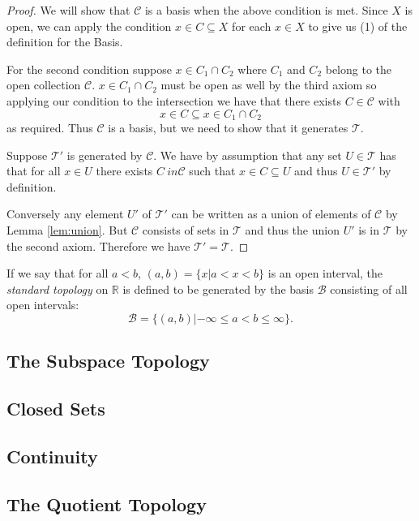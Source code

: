\begin{proof}
  We will show that $\mathscr{C}$ is a basis when the above condition
  is met. Since $X$ is open, we can apply the condition $x \in C
  \subseteq X$ for each $x \in X$ to give us (1) of the definition for
  the Basis.

  For the second condition suppose $x \in C_1 \cap C_2$ where $C_1$
  and $C_2$ belong to the open collection $\mathscr{C}$. $x \in C_1
  \cap C_2$ must be open as well by the third axiom so applying our
  condition to the intersection we have that there exists $C \in
  \mathscr{C}$ with
  \[
    x \in C \subseteq x \in C_1 \cap C_2
  \]
  as required. Thus $\mathscr{C}$ is a basis, but we need to show that
  it generates $\mathscr{T}$.

  Suppose $\mathscr{T}'$ is generated by $\mathscr{C}$. We have by
  assumption that any set $U \in \mathscr{T}$ has that for all $x \in
  U$ there exists $C\ in \mathscr{C}$ such that $x \in C \subseteq U$
  and thus $U \in \mathscr{T}'$ by definition.

  Conversely any element $U'$ of $\mathscr{T}'$ can be written as a
  union of elements of $\mathscr{C}$ by Lemma \ref{lem:union}. But
  $\mathscr{C}$ consists of sets in $\mathscr{T}$ and thus the union
  $U'$ is in $\mathscr{T}$ by the second axiom. Therefore we have
  $\mathscr{T}' = \mathscr{T}$.
\end{proof}

\begin{exmp}
  \label{exmp:standard}
  If we say that for all $a<b$, $(a,b) = \{x | a < x <b \}$ is an open
  interval, the \emph{standard topology} on $\mathbb{R}$ is defined to be
  generated by the basis $\mathscr{B}$ consisting of all open
  intervals:
  \[
    \mathscr{B} = \{(a,b)| -\infty \leq a < b \leq \infty\}.
  \]
\end{exmp}



\subsection{The Subspace Topology}
\label{sec:prelims:subspace}

\subsection{Closed Sets}
\label{sec:prelims:closed}

\subsection{Continuity}
\label{sec:prelims:continuity}

\subsection{The Quotient Topology}
\label{sec:prelims:quotient}


